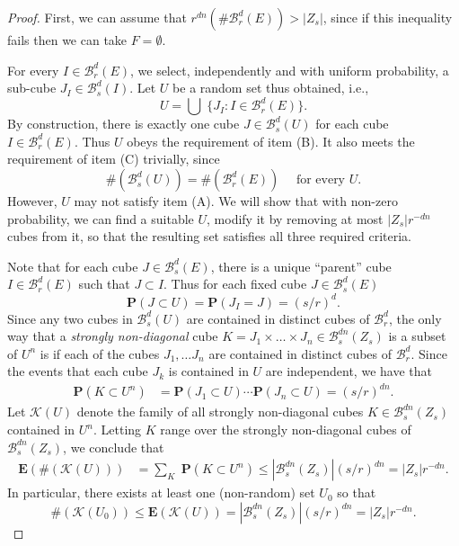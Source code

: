 \documentclass[usenames,dvipsnames,letterpaper, reqno,11pt]{article}
\theoremstyle{plain}
\theoremstyle{plain}
\begin{document}
\begin{proof}

First, we can assume that $r^{dn}(\# \mathcal{B}^d_r(E))> |Z_s|$, since if this inequality fails then we can take $F=\emptyset$. 

For every $I \in \mathcal B_r^d(E)$, we select, independently and with uniform probability, a sub-cube $J_I \in \mathcal B_s^{d}(I)$. Let $U$ be a random set thus obtained, i.e., 
	\[ U = \bigcup\; \{ J_I: I \in \mathcal{B}^d_r(E) \}. \]
By construction, there is exactly one cube $J \in \mathcal B_s^d(U)$ for each cube $I \in \mathcal B_r^d(E)$. Thus $U$ obeys the requirement of item (B). It also meets the requirement of item (C) trivially, since \begin{equation} \label{UE} \# (\mathcal{B}^d_s(U)) = \# (\mathcal{B}^d_r(E)) \quad \text{ for every $U$}. \end{equation}  However, $U$ may not satisfy item (A). We will show that with non-zero probability, we can find a suitable $U$, modify it by removing at most $|Z_s|r^{-dn}$ cubes from it, so that the resulting set satisfies all three required criteria.  

	Note that for each cube $J \in \mathcal{B}^d_s(E)$, there is a unique ``parent'' cube $I \in \mathcal{B}^d_r(E)$ such that $J \subset I$. Thus for each fixed cube $J \in \mathcal{B}^d_s(E)$
	\[ \mathbf{P}(J \subset U) = \mathbf{P}(J_I = J) = (s/r)^d. \]
	Since any two cubes in $\mathcal{B}^d_s(U)$ are contained in distinct cubes of $\mathcal{B}^d_r$, the only way that a {\it strongly non-diagonal} cube $K = J_1 \times \dots \times J_n\in\mathcal{B}^{dn}_s(Z_s)$ is a subset of $U^n$ is if each of the cubes $J_1, \dots J_n$ are contained in distinct cubes of $\mathcal{B}^d_r$. Since the events that each cube $J_k$ is contained in $U$ are independent, we have that
	\begin{align*}
		\mathbf{P}(K \subset U^n) &= \mathbf{P}(J_1 \subset U) \cdots \mathbf{P}(J_n \subset U) = (s/r)^{dn}.
	\end{align*}
	Let $\mathcal{K}(U)$ denote the family of all strongly non-diagonal cubes $K \in \mathcal{B}^{dn}_s(Z_s)$ contained in $U^n$. Letting $K$ range over the strongly non-diagonal cubes of $\mathcal{B}^{dn}_s(Z_s)$, we conclude that
	\begin{align*}
		\mathbf{E}(\# (\mathcal{K}(U))) &= {\sum}_K\; \mathbf{P}(K \subset U^n) \leq |\mathcal{B}^{dn}_s(Z_s)| (s/r)^{dn} = |Z_s| r^{-dn}.
	\end{align*}
	In particular, there exists at least one (non-random) set $U_0$ so that
	\[ \#(\mathcal{K}(U_0)) \leq \mathbf{E}(\mathcal{K}(U)) = |\mathcal{B}^{dn}_s(Z_s)| (s/r)^{dn} = |Z_s| r^{-dn}. \]


\end{proof}
\end{document}
